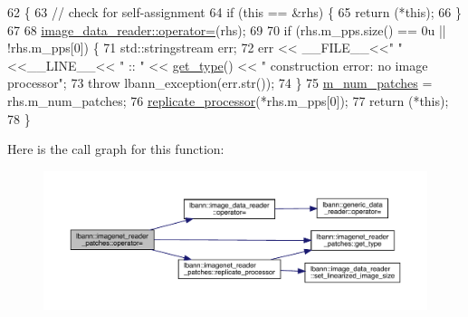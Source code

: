 \begin{DoxyCode}
62                                                                                               \{
63   \textcolor{comment}{// check for self-assignment}
64   \textcolor{keywordflow}{if} (\textcolor{keyword}{this} == &rhs) \{
65     \textcolor{keywordflow}{return} (*\textcolor{keyword}{this});
66   \}
67 
68   \hyperlink{classlbann_1_1image__data__reader_a76a0b52eafb9ad133fb45fec7cf44700}{image\_data\_reader::operator=}(rhs);
69 
70   \textcolor{keywordflow}{if} (rhs.m\_pps.size() == 0u || !rhs.m\_pps[0]) \{
71     std::stringstream err;
72     err << \_\_FILE\_\_<<\textcolor{stringliteral}{" "}<<\_\_LINE\_\_<< \textcolor{stringliteral}{" :: "} << \hyperlink{classlbann_1_1imagenet__reader__patches_adc6363b20f058260c674d92af2a6ef80}{get\_type}() << \textcolor{stringliteral}{" construction error: no image
       processor"};
73     \textcolor{keywordflow}{throw} lbann\_exception(err.str());
74   \}
75   \hyperlink{classlbann_1_1imagenet__reader__patches_a3380936d3d01d5efc77f0f129891fc65}{m\_num\_patches} = rhs.m\_num\_patches;
76   \hyperlink{classlbann_1_1imagenet__reader__patches_a714247cc547161688a66a64737527de0}{replicate\_processor}(*rhs.m\_pps[0]);
77   \textcolor{keywordflow}{return} (*\textcolor{keyword}{this});
78 \}
\end{DoxyCode}
Here is the call graph for this function\+:\nopagebreak
\begin{figure}[H]
\begin{center}
\leavevmode
\includegraphics[width=350pt]{classlbann_1_1imagenet__reader__patches_a02e20aa26fb3b024486b8d5c71d37aa7_cgraph}
\end{center}
\end{figure}
\mbox{\label{classlbann_1_1imagenet__reader__patches_a714247cc547161688a66a64737527de0}} 
